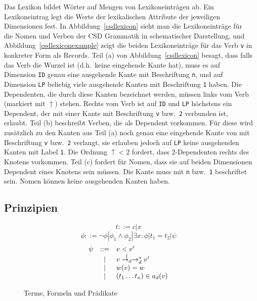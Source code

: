 Das Lexikon bildet W\"orter auf Mengen von Lexikoneintr\"agen ab. Ein
Lexikoneintrag legt die Werte der lexikalischen Attribute der
jeweiligen Dimensionen fest. %
%
In Abbildung~\ref{csdlexicon} sieht man die Lexikoneintr\"age f\"ur
die Nomen und Verben der CSD Grammatik in schematischer Darstellung,
und Abbildung~\ref{csdlexiconexample} zeigt die beiden
Lexikoneintr\"age f\"ur das Verb {\tt v} in konkreter Form als
Records. Teil (a) von Abbildung~\ref{csdlexicon} besagt, dass falls
das Verb die Wurzel ist (d.h.\ keine eingehende Kante hat), muss es auf
Dimension {\tt ID} genau eine ausgehende Kante mit Beschriftung {\tt n}, und auf
Dimension {\tt LP} beliebig viele ausgehende Kanten mit Beschriftung
{\tt 1}
haben. Die Dependenten, die durch diese Kanten bezeichnet werden,
m\"ussen links vom Verb (markiert mit $\uparrow$) stehen. Rechts vom
Verb ist auf {\tt ID} und {\tt LP} h\"ochstens ein Dependent, der mit einer Kante
mit Beschriftung {\tt v} bzw.\ {\tt 2} verbunden ist, erlaubt.  Teil (b)
beschreibt Verben, die als Dependent vorkommen. F\"ur diese wird
zus\"atzlich zu den Kanten aus Teil (a) noch genau eine eingehende
Kante von mit Beschriftung {\tt v} bzw.\ {\tt 2} verlangt, sie erlauben jedoch auf
{\tt LP} keine ausgehenden Kanten mit Label {\tt 1}. Die Ordnung $\uparrow < 2$
fordert, dass 2-Dependenten rechts des Knotens vorkommen.  Teil (c)
fordert f\"ur Nomen, dass sie auf beiden Dimensionen Dependent eines
Knotens sein m\"ussen. Die Kante muss mit {\tt n} bzw.\ {\tt 1} beschriftet
sein. Nomen k\"onnen keine ausgehenden Kanten haben.

\subsection{Prinzipien}
\begin{figure}
$$ t ::= c | x$$
$$\phi ::= \neg \phi | \phi_1 \wedge
            \phi_2 | \exists x : \phi | t_1 = t_2 | \psi $$
            $$
            \begin{array}{r c l}
            \psi & ::= & v < v' \\
                & | & v \overset{l}{\rightarrow_d}\rightarrow_d^* v' \\
                & | & w(v) = w \\
                & | & (t_1 \ldots t_n) \in a_d (v)
            \end{array}
            $$
\caption{Terme, Formeln und Pr\"adikate }
\label{termpred}
\end{figure}

